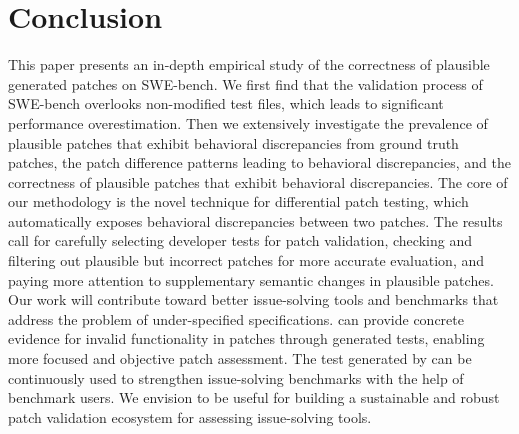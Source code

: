 \section{Conclusion}
This paper presents an in-depth empirical study of the correctness of plausible generated patches on SWE-bench.
We first find that the validation process of SWE-bench overlooks non-modified test files, which leads to significant performance overestimation. 
Then we extensively investigate the prevalence of plausible patches that exhibit behavioral discrepancies from ground truth patches, the patch difference patterns leading to behavioral discrepancies, and the correctness of plausible patches that exhibit behavioral discrepancies.
The core of our methodology is the novel \appname technique for differential patch testing, which automatically exposes behavioral discrepancies between two patches.
The results call for carefully selecting developer tests for patch validation, checking and filtering out plausible but incorrect patches for more accurate evaluation, and paying more attention to supplementary semantic changes in plausible patches.
Our work will contribute toward better issue-solving tools and benchmarks that address the problem of under-specified specifications.
\appname can provide concrete evidence for invalid functionality in patches through generated tests, enabling more focused and objective patch assessment.
The test generated by \appname can be continuously used to strengthen issue-solving benchmarks with the help of benchmark users.
We envision \appname to be useful for building a sustainable and robust patch validation ecosystem for assessing issue-solving tools.



